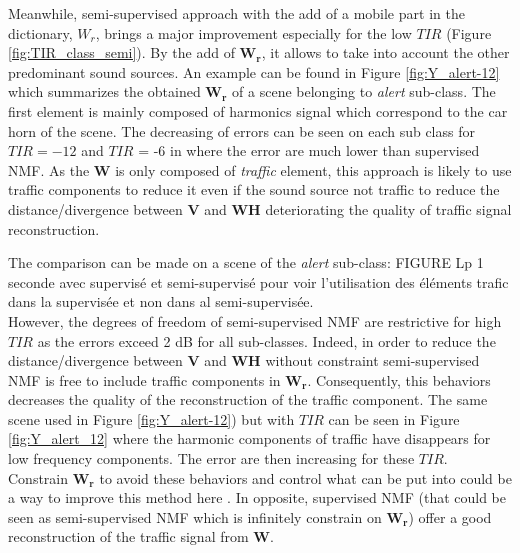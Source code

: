 \documentclass[twocolumn,a4paper,10pt]{article}
\begin{document}
Meanwhile, semi-supervised approach with the add of a mobile part in the dictionary, $W_r$, brings a major improvement especially for the low $TIR$ (Figure \ref{fig:TIR_class_semi}). By the add of $\mathbf{W_r}$, it allows to take into account the other predominant sound sources. An example can be found in Figure \ref{fig:Y_alert-12} which summarizes the obtained $\mathbf{W_r}$ of a scene belonging to \textit{alert} sub-class. The first element is mainly composed of harmonics signal which correspond to the car horn of the scene. The decreasing of errors can be seen on each sub class for $TIR = -12$ and $TIR$ = -6 in  where the error are much lower than supervised NMF. 
As the $\mathbf{W}$ is only composed of \textit{traffic} element, this approach is likely to use traffic components to reduce it even if the sound source not traffic to reduce the distance/divergence between $\mathbf{V}$ and $\mathbf{WH}$ deteriorating the quality of traffic signal reconstruction. 

The comparison can be made on a scene of the \textit{alert} sub-class: 
FIGURE Lp 1 seconde avec supervisé et semi-supervisé pour voir l'utilisation des éléments trafic dans la supervisée et non dans al semi-supervisée. \\

However, the degrees of freedom of semi-supervised NMF are restrictive for high $TIR$ as the errors exceed 2 dB for all sub-classes. Indeed, in order to reduce the distance/divergence between $\mathbf{V}$ and $\mathbf{WH}$ without constraint semi-supervised NMF is free to include traffic components in $\mathbf{W_r}$. Consequently, this behaviors decreases the quality of the reconstruction of the traffic component. The same scene used in Figure \ref{fig:Y_alert-12}) but with $TIR$ can be seen in Figure \ref{fig:Y_alert_12} where the harmonic components of traffic have disappears for low frequency components. The error are then increasing for these $TIR$. Constrain $\mathbf{W_r}$ to avoid these behaviors and control what can be put into could be a way to improve this method here \cite{kitamura_music_2014}. In opposite, supervised NMF (that could be seen as semi-supervised NMF which is infinitely constrain on $\mathbf{W_r}$) offer a good reconstruction of the traffic signal from $\mathbf{W}$.\\
\end{document}
